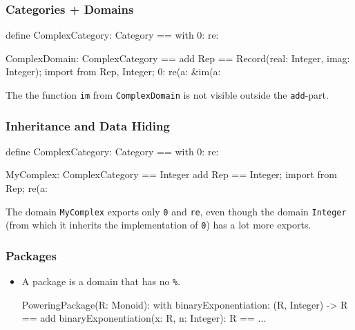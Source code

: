 \begin{frame}[fragile]
\frametitle{Categories + Domains}
\begin{myverbatim}
define ComplexCategory: Category == with {
  0: %
  re: %
}

ComplexDomain: ComplexCategory == add {
  Rep == Record(real: Integer, imag: Integer);
  import from Rep, Integer;
  0: %
  re(a: %
  &im(a: %
}
\end{myverbatim}
\end{frame}

The the function \texttt{im} from \texttt{ComplexDomain} is not
visible outside the \texttt{add}-part.

















\begin{frame}[fragile]
\frametitle{Inheritance and Data Hiding}
\begin{myverbatim}
define ComplexCategory: Category == with {
  0: %
  re: %
}

MyComplex: ComplexCategory == Integer add {
  Rep == Integer;
  import from Rep;
  re(a: %
}
\end{myverbatim}
\end{frame}

The domain \texttt{MyComplex} exports only \texttt{0} and \texttt{re},
even though the domain \texttt{Integer} (from which it inherits the
implementation of \texttt{0}) has a lot more exports.

















\frametitle{Packages}
\begin{itemize}
\item A package is a domain that has no \verb'%'.
\begin{myverbatim}
PoweringPackage(R: Monoid): with {
  binaryExponentiation: (R, Integer) -> R
} == add {
  binaryExponentiation(x: R, n: Integer): R == {
    ...
  }
}
\end{myverbatim}
\end{itemize}












